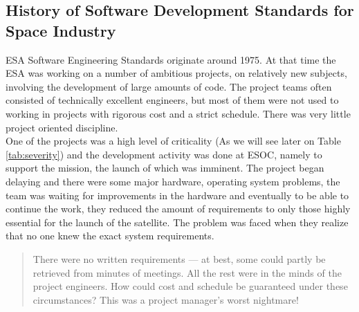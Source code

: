 {\subsection{History of Software Development Standards for Space Industry}\label{sec:historyspace}
\ac{ESA} Software Engineering Standards originate around 1975. At
that time the \ac{ESA} was working on a number of ambitious projects, on relatively new subjects, involving the development of
large amounts of code. The project teams often consisted of technically excellent engineers, but most of them were not used to working in projects with
rigorous cost and a strict schedule. There was very little project oriented discipline\cite{esa-bulletin-90}.\\

One of the projects was a high level of criticality (As we will see later on Table \ref{tab:severity}) and the
development activity was done at \ac{ESOC}, namely to support the mission, the launch of which was imminent.
The project began delaying and there were some major hardware, operating system problems, the team was waiting for improvements in the hardware
and eventually to be able to continue the work, they reduced the amount of requirements to only
those highly essential for the launch of the satellite. The problem was faced when they realize that no one knew the exact system requirements.
\begin{quotation}
There were no written requirements — at best, some could partly be
retrieved from minutes of meetings. All the rest were in the minds of the project engineers. How
could cost and schedule be guaranteed under these circumstances? This was a project manager's
worst nightmare!\cite{esa-bulletin-90}
\end{quotation}

}

